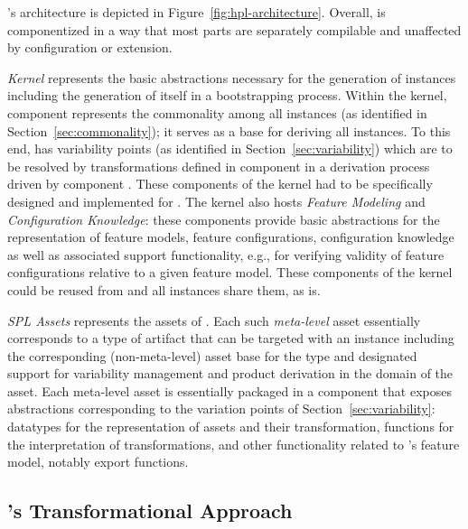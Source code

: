 \hpl's architecture is depicted in Figure~\ref{fig:hpl-architecture}. Overall, \hpl{} is componentized in a way that most parts are separately compilable and unaffected by configuration or extension.

\emph{Kernel} represents the basic abstractions necessary for the generation of \hpl{} instances including the generation of \hpl{} itself in a bootstrapping process. Within the kernel, component \hpbase{} represents the commonality among all \hpl{} instances (as identified in Section~\ref{sec:commonality}); it serves as a base for deriving all \hpl{} instances. To this end, \hpbase{} has variability points (as identified in Section~\ref{sec:variability}) which are to be resolved by transformations defined in component \hpsplasset{} in a derivation process driven by component \hpproduct. These components of the kernel had to be specifically designed and implemented for \hpl. The kernel also hosts \emph{Feature Modeling} and \emph{Configuration Knowledge}: these components provide
basic abstractions for the representation of feature models, feature configurations, configuration knowledge as well as associated support functionality, e.g., for verifying validity of feature configurations relative to a given feature model. These components of the kernel could be reused from \hp{} and all \hpl{} instances share them, as is.

\textit{SPL Assets} represents the assets of \hpl. Each such \emph{meta-level} asset essentially corresponds to a type of artifact that can be targeted with an \hpl{} instance including the corresponding (non-meta-level) asset base for the type and designated support for variability management and product derivation in the domain of the asset. Each meta-level asset is essentially packaged in a component that exposes abstractions corresponding to the variation points of Section~\ref{sec:variability}: datatypes for the representation of assets and their transformation, functions for the interpretation of transformations, and other functionality related to \hpl's feature model, notably export functions.


\subsection{\hpl's Transformational Approach} 
\label{sec:hpl-transformation}

